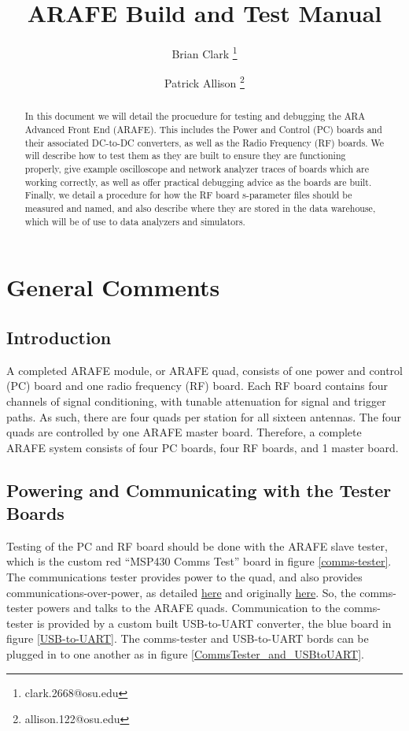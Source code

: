 \documentclass[letter,12pt]{article}
\title{\vspace{-2.0cm}ARAFE Build and Test Manual}
\author[1]{Brian Clark \thanks{clark.2668@osu.edu}}
\author[1]{Patrick Allison \thanks{allison.122@osu.edu}}
\affil[1]{\footnotesize{Department of Physics \& Center for Cosmology and Astroparticle Physics (CCAPP), The Ohio State University}}
\begin{document}
\maketitle

\begin{abstract}
In this document we will detail the procuedure for testing and debugging the ARA Advanced Front End (ARAFE). This includes the Power and Control (PC) boards and their associated DC-to-DC converters, as well as the Radio Frequency (RF) boards. We will describe how to test them as they are built to ensure they are functioning properly, give example oscilloscope and network analyzer traces of boards which are working correctly, as well as offer practical debugging advice as the boards are built. Finally, we detail a procedure for how the RF board s-parameter files should be measured and named, and also describe where they are stored in the data warehouse, which will be of use to data analyzers and simulators.
\end{abstract}

\tableofcontents
\newpage

\section{General Comments}

\subsection{Introduction}

A completed ARAFE module, or ARAFE quad, consists of one power and control (PC) board and one radio frequency (RF) board. Each RF board contains four channels of signal conditioning, with tunable attenuation for signal and trigger paths. As such, there are four quads per station for all sixteen antennas. The four quads are controlled by one ARAFE master board. Therefore, a complete ARAFE system consists of four PC boards, four RF boards, and 1 master board.

\subsection{Powering and Communicating with the Tester Boards \label{subsec:Powering-and-Communicating-Tester}}

Testing of the PC and RF board should be done with the ARAFE slave tester, which is the custom red ``MSP430 Comms Test'' board in figure \ref{comms-tester}. The communications tester provides power to the quad, and also provides communications-over-power, as detailed \href{https://www.dropbox.com/s/eggk51tj8gkmlpj/arafe_master_stuff.pdf?dl=0}{here} and originally \href{http://electronicdesign.com/communications/simple-circuit-communicates-over-low-voltage-power-lines}{here}. So, the comms-tester powers and talks to the ARAFE quads. Communication to the comms-tester is provided by a custom built USB-to-UART converter, the blue board in figure \ref{USB-to-UART}. The comms-tester and USB-to-UART bords can be plugged in to one another as in figure \ref{CommsTester_and_USBtoUART}. 
\end{document}
